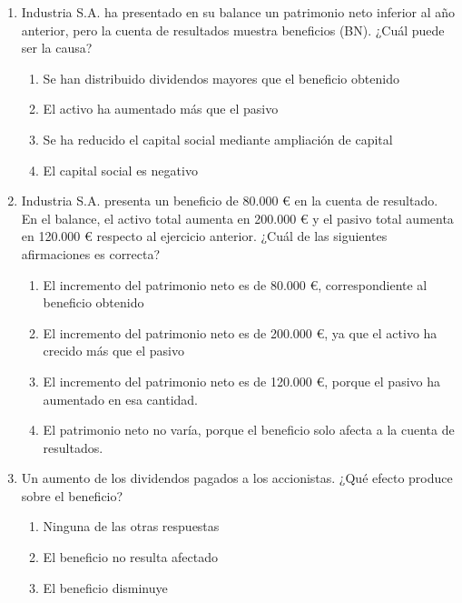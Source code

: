 \begin{enumerate}
\begin{enumerate}
        \item Aumenta el patrimonio neto en 40.000 €, sin afectar directamente al activo ni al pasivo
        \item Aumenta el acivo en 40.000 € y reduce el patrimonio neto en el mismo importe
        \item Disminuye el pasivo en 40.000 € y aumenta las reservas.
    \end{enumerate}
    \item Industria S.A. ha presentado en su balance un patrimonio neto inferior al año anterior, pero la cuenta de resultados muestra beneficios (BN). ¿Cuál puede ser la causa?
    \begin{enumerate}
        \item Se han distribuido dividendos mayores que el beneficio obtenido
        \item El activo ha aumentado más que el pasivo
        \item Se ha reducido el capital social mediante ampliación de capital
        \item El capital social es negativo
    \end{enumerate}
    \item Industria S.A. presenta un beneficio de 80.000 € en la cuenta de resultado. En el balance, el activo total aumenta en 200.000 € y el pasivo total aumenta en 120.000 € respecto al ejercicio anterior. ¿Cuál de las siguientes afirmaciones es correcta?
    \begin{enumerate}
        \item El incremento del patrimonio neto es de 80.000 €, correspondiente al beneficio obtenido
        \item El incremento del patrimonio neto es de 200.000 €, ya que el activo ha crecido más que el pasivo
        \item El incremento del patrimonio neto es de 120.000 €, porque el pasivo ha aumentado en esa cantidad.
        \item El patrimonio neto no varía, porque el beneficio solo afecta a la cuenta de resultados.
    \end{enumerate}
    \item Un aumento de los dividendos pagados a los accionistas. ¿Qué efecto produce sobre el beneficio?
    \begin{enumerate}
        \item Ninguna de las otras respuestas
        \item El beneficio no resulta afectado
        \item El beneficio disminuye

\end{enumerate}
\end{enumerate}
